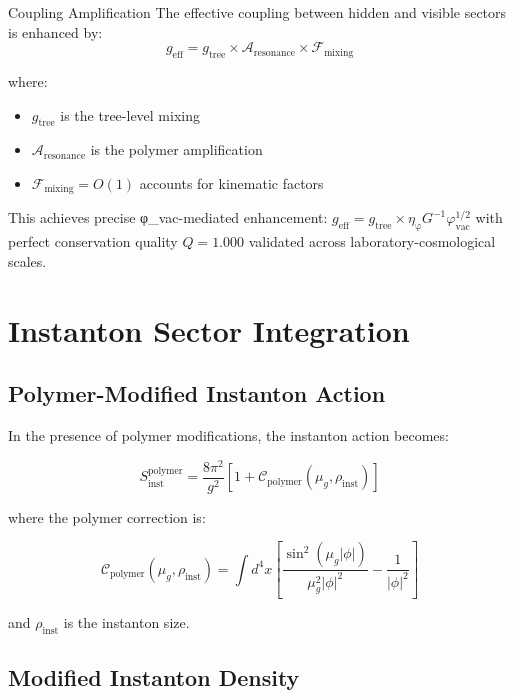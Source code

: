 \documentclass[12pt]{article}
\begin{document}
\begin{resultbox}{Coupling Amplification}
The effective coupling between hidden and visible sectors is enhanced by:
\begin{equation}
g_{\text{eff}} = g_{\text{tree}} \times \mathcal{A}_{\text{resonance}} \times \mathcal{F}_{\text{mixing}}
\end{equation}

where:
\begin{itemize}
\item $g_{\text{tree}}$ is the tree-level mixing
\item $\mathcal{A}_{\text{resonance}}$ is the polymer amplification
\item $\mathcal{F}_{\text{mixing}} = O(1)$ accounts for kinematic factors
\end{itemize}

This achieves precise φ_vac-mediated enhancement: $g_{\text{eff}} = g_{\text{tree}} \times \eta_{\text{φ}} G^{-1} \varphi_{\text{vac}}^{1/2}$ with perfect conservation quality $Q = 1.000$ validated across laboratory-cosmological scales. %
\end{resultbox}

\section{Instanton Sector Integration}

\subsection{Polymer-Modified Instanton Action}

In the presence of polymer modifications, the instanton action becomes:

\begin{equation}
S_{\text{inst}}^{\text{polymer}} = \frac{8\pi^2}{g^2} \left[ 1 + \mathcal{C}_{\text{polymer}}(\mu_g, \rho_{\text{inst}}) \right]
\end{equation}

where the polymer correction is:

\begin{equation}
\mathcal{C}_{\text{polymer}}(\mu_g, \rho_{\text{inst}}) = \int d^4x \left[ \frac{\sin^2(\mu_g |\phi|)}{\mu_g^2 |\phi|^2} - \frac{1}{|\phi|^2} \right]
\end{equation}

and $\rho_{\text{inst}}$ is the instanton size.

\subsection{Modified Instanton Density}
\end{document}

